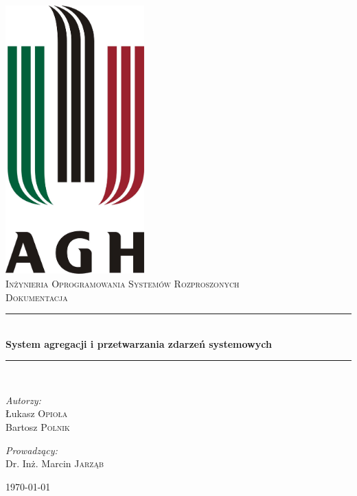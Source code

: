 \documentclass[a4paper,11pt]{article}
\newcommand{\HRule}{\rule{\linewidth}{0.5mm}}
\begin{document}
\begin{titlepage}
    \begin{center}
        \includegraphics[width=0.4\textwidth]{images/logo.jpg} \\[1cm]
        \textsc{\LARGE Inżynieria Oprogramowania Systemów Rozproszonych} \\[0.8cm]
        \textsc{\LARGE Dokumentacja} \\[0.5cm]
        \HRule \\[0.4cm]
        { \huge \bfseries System agregacji i przetwarzania zdarzeń systemowych} \\[0.4cm]
        \HRule \\[1.5cm]
    
    \begin{minipage}{0.4\textwidth}
        \begin{flushleft} \large
        \emph{Autorzy:} \\
        Łukasz \textsc{Opioła} \\
        Bartosz \textsc{Polnik}
        \end{flushleft}
    \end{minipage}
    \begin{minipage}{0.4\textwidth}
        \begin{flushright} \large
            \emph{Prowadzący:} \\
            Dr. Inż. Marcin \textsc{Jarząb}
        \end{flushright}
    \end{minipage}

    \vfill

    {\large \today}

    \end{center}
\end{titlepage}
\end{document}
